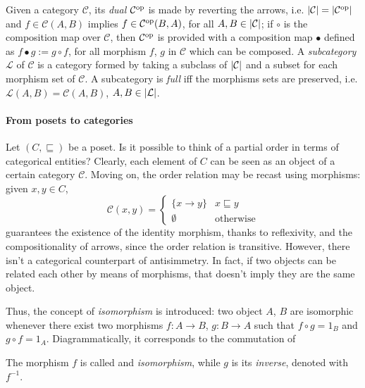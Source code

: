 Given a category \(\mathcal{C}\), its \emph{dual} \(\mathcal{C}^\textup{op}\) is made by reverting the arrows, i.e. \(\lvert \mathcal{C} \rvert = \lvert \mathcal{C}^\textup{op} \rvert\) and \(f \in \mathcal{C}(A,B)\) implies \(f \in \mathcal{C}^\textup{op}(B,A)\), for all \(A,B \in \lvert \mathcal{C} \rvert\);
if \(\circ{}\) is the composition map over \(\mathcal{C}\), then \(\mathcal{C}^\textup{op}\) is provided with a composition map \(\bullet\) defined as \(f \bullet g := g \circ f\), for all morphism \(f\), \(g\) in \(\mathcal{C}\) which can be composed.%
A \emph{subcategory} \(\mathcal{L}\) of \(\mathcal{C}\) is a category formed by taking a subclass of \(\lvert \mathcal{C} \rvert\) and a subset for each morphism set of \(\mathcal{C}\). %
A subcategory is \emph{full} iff the morphisms sets are preserved, i.e. \(\mathcal{L}(A,B) = \mathcal{C}(A,B)\), \(A,B \in \lvert \mathcal{L} \rvert\).

\paragraph{From posets to categories} Let \((C,\sqsubseteq)\) be a poset. Is it possible to think of a partial order in terms of categorical entities?
Clearly, each element of \(C\) can be seen as an object of a certain category \(\mathcal{C}\). Moving on, the order relation may be recast using morphisms: given \(x, y \in C\),
\begin{equation*}
  \mathcal{C}(x,y) =
  \begin{cases}
    \lbrace x \to y \rbrace & x \sqsubseteq y \\ \emptyset & \text{otherwise}
  \end{cases}
\end{equation*}
guarantees the existence of the identity morphism, thanks to reflexivity, and the compositionality of arrows, since the order relation is transitive.
However, there isn't a categorical counterpart of antisimmetry.
In fact, if two objects can be related each other by means of morphisms, that doesn't imply they are the same object.

Thus, the concept of \emph{isomorphism} is introduced: two object \(A\), \(B\) are isomorphic whenever there exist two morphisms \(f \colon A \to B\), \(g \colon B \to A\) such that \(f \circ g = 1_B\) and \(g \circ f = 1_A\). Diagrammatically, it corresponds to the commutation of
\begin{center}
\end{center}
The morphism \(f\) is called and \emph{isomorphism}, while \(g\) is its \emph{inverse}, denoted with \(f^{-1}\).


